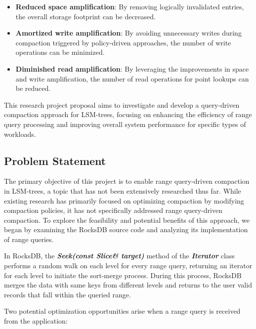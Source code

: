 \documentclass[balance=false, sigconf]{acmart}
\begin{document}
\begin{itemize}
    \item \textbf{Reduced space amplification}: By removing logically invalidated 
    entries, the overall storage footprint can be decreased.
    \item \textbf{Amortized write amplification}: By avoiding unnecessary writes during 
    compaction triggered by policy-driven approaches, the number of write operations 
    can be minimized.
    \item \textbf{Diminished read amplification}: By leveraging the improvements in 
    space and write amplification, the number of read operations for point lookups 
    can be reduced.
\end{itemize}

This research project proposal aims to investigate and develop a query-driven compaction 
approach for LSM-trees, focusing on enhancing the efficiency of range query processing 
and improving overall system performance for specific types of workloads.

\subsection{Problem Statement}

The primary objective of this project is to enable range query-driven compaction in LSM-trees, 
a topic that has not been extensively researched thus far. While existing research has 
primarily focused on optimizing compaction by modifying compaction policies, it has not 
specifically addressed range query-driven compaction. To explore the feasibility and potential 
benefits of this approach, we began by examining the RocksDB source code and analyzing its 
implementation of range queries.

In RocksDB, the \textbf{\textit{Seek(const Slice\& target)}} method of the \textbf{\textit{Iterator}} \cite{rocksdbiterator}
class performs a random walk on each level for every range query, returning an iterator for 
each level to initiate the sort-merge process. During this process, RocksDB merges the data 
with same keys from different levels and returns to the user valid records that fall within the 
queried range.

Two potential optimization opportunities arise when a range query is received from the application:
\end{document}
